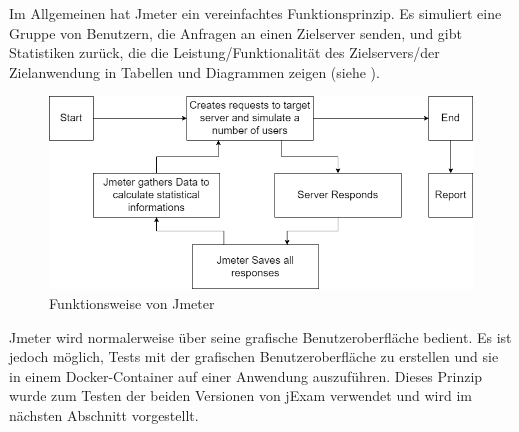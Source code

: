 Im Allgemeinen hat Jmeter ein vereinfachtes Funktionsprinzip. Es simuliert
eine Gruppe von Benutzern, die Anfragen an einen Zielserver senden, und
gibt Statistiken zurück, die die Leistung/Funktionalität des Zielservers/der
Zielanwendung in Tabellen und Diagrammen zeigen (siehe ).

\begin{figure}[H]
    \centering
    \includegraphics[scale=0.5]{images/jmeter-princip}
    \caption{Funktionsweise von Jmeter} \label{fig:jmeter-prinzip}
\end{figure}

Jmeter wird normalerweise  über seine grafische Benutzeroberfläche
bedient. Es ist  jedoch möglich, Tests mit der grafischen
Benutzeroberfläche zu erstellen und sie in einem Docker-Container auf einer
Anwendung auszuführen. Dieses  Prinzip wurde zum Testen der beiden Versionen
von jExam verwendet und wird  im nächsten Abschnitt vorgestellt.






